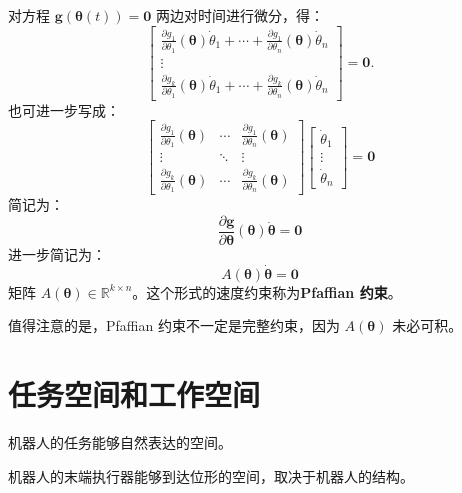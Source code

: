 对方程 $\boldsymbol{g}(\boldsymbol{\theta}(t))=\boldsymbol{0}$ 两边对时间进行微分，得：
\begin{equation}
	\label{eq:位形与速度约束:时间导数}
	\begin{bmatrix}
		\frac{\partial g_{1}}{\partial \theta_{1}}(\boldsymbol{\theta})\dot{\theta}_{1}+\cdots+\frac{\partial g_{1}}{\partial \theta_{n}}(\boldsymbol{\theta})\dot{\theta}_{n}\\
		\vdots\\
		\frac{\partial g_{k}}{\partial \theta_{1}}(\boldsymbol{\theta})\dot{\theta}_{1}+\cdots+\frac{\partial g_{k}}{\partial \theta_{n}}(\boldsymbol{\theta})\dot{\theta}_{n}
	\end{bmatrix}=\boldsymbol{0}.
\end{equation}
也可进一步写成：
\begin{equation}
	\label{eq:位形与速度约束:雅可比形式}
	\begin{bmatrix}
		\frac{\partial g_{1}}{\partial \theta_{1}}(\boldsymbol{\theta}) & \cdots & \frac{\partial g_{1}}{\partial \theta_{n}}(\boldsymbol{\theta})\\
		\vdots & \ddots & \vdots\\
		\frac{\partial g_{k}}{\partial \theta_{1}}(\boldsymbol{\theta}) & \cdots & \frac{\partial g_{k}}{\partial \theta_{n}}(\boldsymbol{\theta})
	\end{bmatrix}
	\begin{bmatrix}
		\dot{\theta}_{1}\\
		\vdots\\
		\dot{\theta}_{n}
	\end{bmatrix}=\boldsymbol{0}
\end{equation}
简记为：
\begin{equation}
	\label{eq:位形与速度约束:速度约束}
	\frac{\partial \boldsymbol{g}}{\partial \boldsymbol{\theta}}(\boldsymbol{\theta})\dot{\boldsymbol{\theta}}=\boldsymbol{0}
\end{equation}
进一步简记为：
\begin{equation}
	\label{eq:位形与速度约束:速度约束矩阵形式}
	A(\boldsymbol{\theta})\dot{\boldsymbol{\theta}}=\boldsymbol{0}
\end{equation}
矩阵 $A(\boldsymbol{\theta})\in\mathbb{R}^{k\times n}$。这个形式的速度约束称为\textbf{Pfaffian 约束}。

值得注意的是，Pfaffian 约束不一定是完整约束，因为 $A(\boldsymbol{\theta})$ 未必可积。

\section{任务空间和工作空间}

\begin{definition}[任务空间]
	机器人的任务能够自然表达的空间。
\end{definition}

\begin{definition}[工作空间]
	机器人的末端执行器能够到达位形的空间，取决于机器人的结构。
\end{definition}
